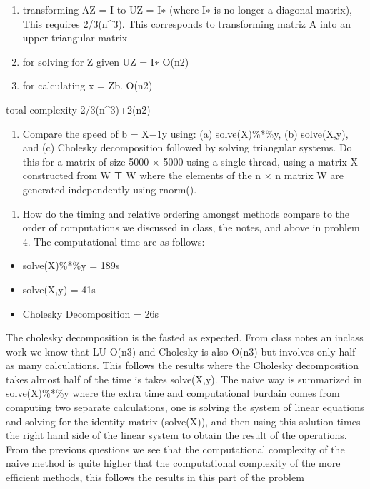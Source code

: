 \documentclass[]{article}
\providecommand{\tightlist}{%
  \setlength{\itemsep}{0pt}\setlength{\parskip}{0pt}}
\begin{document}
\begin{enumerate}
\def\labelenumi{(\alph{enumi})}
\tightlist
\item
  transforming AZ = I to UZ = I∗ (where I∗ is no longer a diagonal
  matrix), This requires 2/3(n\^{}3). This corresponds to transforming
  matriz A into an upper triangular matrix
\item
  for solving for Z given UZ = I∗ O(n2)
\item
  for calculating x = Zb. O(n2)
\end{enumerate}

total complexity 2/3(n\^{}3)+2(n2)

\begin{enumerate}
\def\labelenumi{\arabic{enumi}.}
\setcounter{enumi}{4}
\tightlist
\item
  Compare the speed of b = X−1y using: (a) solve(X)\%*\%y, (b)
  solve(X,y), and (c) Cholesky decomposition followed by solving
  triangular systems. Do this for a matrix of size 5000 × 5000 using a
  single thread, using a matrix X constructed from W ⊤ W where the
  elements of the n × n matrix W are generated independently using
  rnorm().
\end{enumerate}

\begin{enumerate}
\def\labelenumi{(\alph{enumi})}
\tightlist
\item
  How do the timing and relative ordering amongst methods compare to the
  order of computations we discussed in class, the notes, and above in
  problem 4. The computational time are as follows:
\end{enumerate}

\begin{itemize}
\tightlist
\item
  solve(X)\%*\%y = 189s
\item
  solve(X,y) = 41s
\item
  Cholesky Decomposition = 26s
\end{itemize}

The cholesky decomposition is the fasted as expected. From class notes
an inclass work we know that LU O(n3) and Cholesky is also O(n3) but
involves only half as many calculations. This follows the results where
the Cholesky decomposition takes almost half of the time is takes
solve(X,y). The naive way is summarized in solve(X)\%*\%y where the
extra time and computational burdain comes from computing two separate
calculations, one is solving the system of linear equations and solving
for the identity matrix (solve(X)), and then using this solution times
the right hand side of the linear system to obtain the result of the
operations. From the previous questions we see that the computational
complexity of the naive method is quite higher that the computational
complexity of the more efficient methods, this follows the results in
this part of the problem
\end{document}

